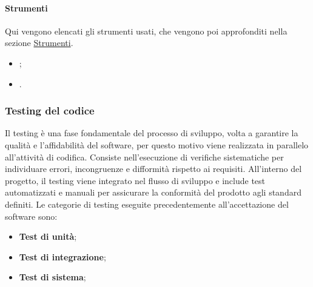 \paragraph{Strumenti}
Qui vengono elencati gli strumenti usati, che vengono poi approfonditi nella sezione \hyperref[sec:strumenti]{Strumenti}.
\begin{itemize}
    \item {};
    \item {}.
\end{itemize}

\subsubsection{Testing del codice}
\label{subsubsec:testing_codice}
Il testing è una fase fondamentale del processo di sviluppo, volta a garantire la qualità e l'affidabilità del software, per questo motivo viene realizzata in parallelo all'attività di codifica.
Consiste nell'esecuzione di verifiche sistematiche per individuare errori, incongruenze e difformità rispetto ai requisiti. 
All'interno del progetto, il testing viene integrato nel flusso di sviluppo e include test automatizzati e manuali per assicurare la conformità del prodotto agli standard definiti.
Le categorie di testing eseguite precedentemente all'accettazione del software sono:
\begin{itemize}
    \item \textbf{Test di unità};
    \item \textbf{Test di integrazione};
    \item \textbf{Test di sistema};
\end{itemize}

